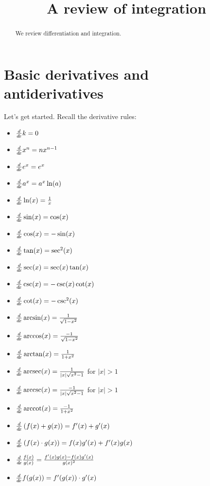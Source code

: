 \documentclass{ximera}
\title[Dig-In:]{A review of integration}
\begin{document}
\begin{abstract}
  We review differentiation and integration.
\end{abstract}
\maketitle


\section{Basic derivatives and antiderivatives}

Let's get started. Recall the derivative rules:

\begin{theorem}\hfil
\begin{itemize}
\item $\frac{d}{\mathop{}\!d\! x} k =0$
\item $\frac{d}{\mathop{}\!d\! x} x^n  = n x^{n-1}$
\item $\frac{d}{\mathop{}\!d\! x} e^x = e^x$
\item $\frac{d}{\mathop{}\!d\! x} a^x = a^x\ln(a)$
\item $\frac{d}{\mathop{}\!d\! x} \ln(x) = \frac{1}{x}$
\item $\frac{d}{\mathop{}\!d\! x} \sin(x) = \cos(x)$
\item $\frac{d}{\mathop{}\!d\! x} \cos(x) = -\sin(x)$  
\item $\frac{d}{\mathop{}\!d\! x} \tan(x) = \sec^2(x)$  
\item $\frac{d}{\mathop{}\!d\! x} \sec(x) = \sec(x)\tan(x)$ 
\item $\frac{d}{\mathop{}\!d\! x} \csc(x) = -\csc(x)\cot(x)$
\item $\frac{d}{\mathop{}\!d\! x} \cot(x) = -\csc^2(x)$
\item $\frac{d}{\mathop{}\!d\! x} \arcsin(x) = \frac{1}{\sqrt{1-x^2}}$
\item $\frac{d}{\mathop{}\!d\! x} \arccos(x) = \frac{-1}{\sqrt{1-x^2}}$
\item $\frac{d}{\mathop{}\!d\! x} \arctan(x) =\frac{1}{1+x^2}$
\item $\frac{d}{\mathop{}\!d\! x} \operatorname{arcsec}(x) = \frac{1}{|x|\sqrt{x^2-1}}$ for $|x|>1$
\item $\frac{d}{\mathop{}\!d\! x} \operatorname{arccsc}(x) = \frac{-1}{|x|\sqrt{x^2-1}}$ for $|x|>1$
\item $\frac{d}{\mathop{}\!d\! x} \operatorname{arccot}(x) = \frac{-1}{1+x^2}$
\item $\frac{d}{\mathop{}\!d\! x} \left( f(x) + g(x) \right) = f'(x) + g'(x)$
\item $\frac{d}{\mathop{}\!d\! x} \left( f(x) \cdot g(x) \right) = f(x)g'(x) + f'(x)g(x)$
\item $\frac{d}{\mathop{}\!d\! x}\frac{f(x)}{g(x)} = \frac{f'(x)g(x) - f(x)g'(x)}{g(x)^2}$
\item $\frac{d}{\mathop{}\!d\! x} f(g(x)) = f'(g(x)) \cdot g'(x)$
\end{itemize}
\end{theorem}
\end{document}
